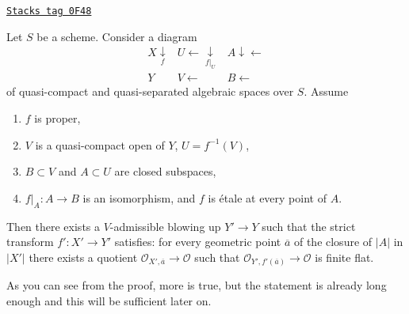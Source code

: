 \begin{lemma}
\label{spaces-pushouts-lemma-blowup-etale-along}
\href{https://stacks.math.columbia.edu/tag/0F48}{\texttt{Stacks tag 0F48}}

Let $S$ be a scheme. Consider a diagram
$$
\begin{array}{ccc}X \underset{f}{\downarrow} & U \longleftarrow\underset{f|_U}{\downarrow} & A \downarrow\longleftarrow \\ Y & V \longleftarrow & B \longleftarrow\end{array}
$$
of quasi-compact and quasi-separated algebraic spaces over $S$.
Assume
\begin{enumerate}
\item $f$ is proper,
\item $V$ is a quasi-compact open of $Y$, $U = f^{-1}(V)$,
\item $B \subset V$ and $A \subset U$ are closed subspaces,
\item $f|_A : A \to B$ is an isomorphism, and
$f$ is \'etale at every point of $A$.
\end{enumerate}
Then there exists a $V$-admissible blowing up $Y' \to Y$ such that the strict
transform $f' : X' \to Y'$ satisfies: for every geometric point
$\overline{a}$ of the closure of $|A|$ in $|X'|$
there exists a quotient $\mathcal{O}_{X', \overline{a}} \to \mathcal{O}$
such that $\mathcal{O}_{Y', f'(\overline{a})} \to \mathcal{O}$
is finite flat.
\end{lemma}

As you can see from the proof, more is true, but the statement is
already long enough and this will be sufficient later on.

